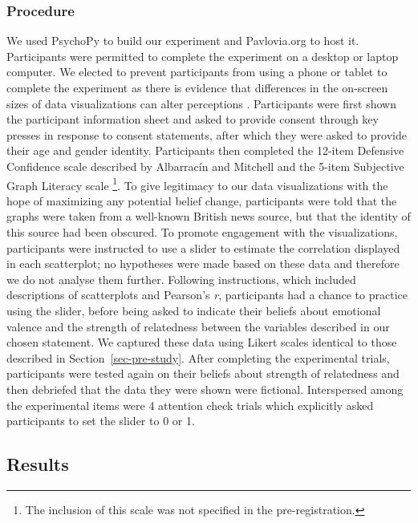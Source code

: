 \documentclass[sigconf]{acmart}
\begin{document}
\subsubsection{Procedure}\label{sec-procedure-main}

We used PsychoPy \citep{pierce_2019} to build our experiment and
Pavlovia.org to host it. Participants were permitted to complete the
experiment on a desktop or laptop computer. We elected to prevent
participants from using a phone or tablet to complete the experiment as
there is evidence that differences in the on-screen sizes of data
visualizations can alter perceptions \citep{cleveland_1982}.
Participants were first shown the participant information sheet and
asked to provide consent through key presses in response to consent
statements, after which they were asked to provide their age and gender
identity. Participants then completed the 12-item Defensive Confidence
scale described by Albarracín and Mitchell \citep{albarracin_2004} and
the 5-item Subjective Graph Literacy scale \citep{garcia_2016}
\footnote{The inclusion of this scale was not specified in the
  pre-registration.}. To give legitimacy to our data visualizations with
the hope of maximizing any potential belief change, participants were
told that the graphs were taken from a well-known British news source,
but that the identity of this source had been obscured. To promote
engagement with the visualizations, participants were instructed to use
a slider to estimate the correlation displayed in each scatterplot; no
hypotheses were made based on these data and therefore we do not analyse
them further. Following instructions, which included descriptions of
scatterplots and Pearson's \emph{r}, participants had a chance to
practice using the slider, before being asked to indicate their beliefs
about emotional valence and the strength of relatedness between the
variables described in our chosen statement. We captured these data
using Likert scales identical to those described in
Section~\ref{sec-pre-study}. After completing the experimental trials,
participants were tested again on their beliefs about strength of
relatedness and then debriefed that the data they were shown were
fictional. Interspersed among the experimental items were 4 attention
check trials which explicitly asked participants to set the slider to 0
or 1.

\subsection{Results}\label{sec-results-main}
\end{document}
